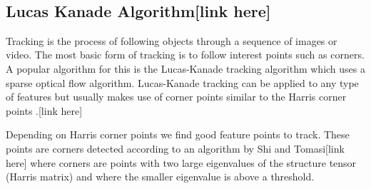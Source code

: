 \documentclass[12pt,fleqn]{book} %
\begin{document}
\begin{figure}[h]
\begin{dBox}
\centering
  \mbox{
   }
   \caption{\label{fig:dynamic91011} }   
\end{dBox}   
\end{figure}

\subsection{Lucas Kanade Algorithm[link here]}
Tracking is the process of following objects through a sequence of images or video. The most basic form of tracking is to follow interest points such as corners. A popular algorithm for this is the Lucas-Kanade tracking algorithm which uses a sparse optical flow algorithm. Lucas-Kanade tracking can be applied to any type of features but usually makes use of corner points similar to the Harris corner points .[link here]\bigskip

Depending on Harris corner points we find good feature points to track. These points are corners detected according to an algorithm by Shi and Tomasi[link here]  where corners are points with two large eigenvalues of the structure tensor (Harris matrix) and where the smaller eigenvalue is above a threshold.\bigskip
\end{document}
